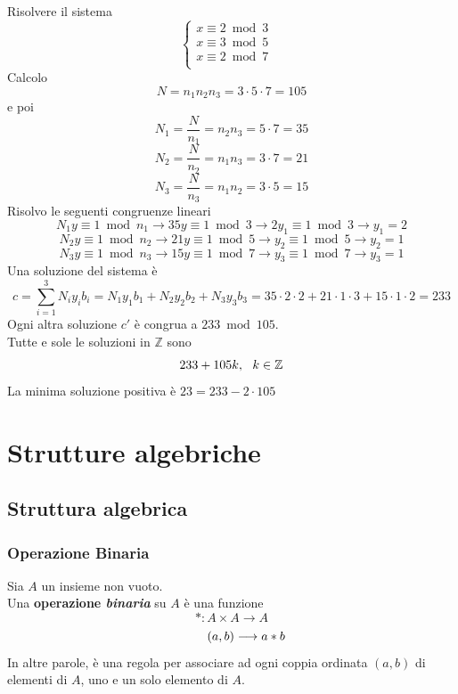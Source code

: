 \documentclass[a4paper,12pt, oneside]{book}
\begin{document}
		\begin{shaded}
			\begin{esempio}
				Risolvere il sistema
				$$\begin{cases}
				x \equiv 2 \bmod 3 \\
				x \equiv 3 \bmod 5 & \\
				x \equiv 2 \bmod 7 & \\
				\end{cases}$$
				Calcolo $$N = n_1n_2n_3 = 3 \cdot 5 \cdot 7 = 105$$ e poi
					$$N_1=\frac{N}{n_1}=n_2n_3=5\cdot7=35$$
					$$N_2=\frac{N}{n_2}=n_1n_3=3\cdot7=21$$
					$$N_3=\frac{N}{n_3}=n_1n_2=3\cdot5=15$$
				Risolvo le seguenti congruenze lineari
				$$N_1y \equiv 1 \bmod n_1 \rightarrow 35y \equiv 1 \bmod 3 \rightarrow 2y_1 \equiv 1 \bmod 3 \longrightarrow y_1=2$$
				$$N_2y \equiv 1 \bmod n_2 \rightarrow 21y \equiv 1 \bmod 5 \rightarrow y_2  \equiv 1 \bmod 5 \longrightarrow y_2=1$$
				$$N_3y \equiv 1 \bmod n_3 \rightarrow 15y \equiv 1 \bmod 7 \rightarrow y_3  \equiv 1 \bmod 7 \longrightarrow y_3=1$$
				Una soluzione del sistema è
				$$c = \sum_{i=1}^{3} N_iy_ib_i = N_1y_1b_1 + N_2y_2b_2 + N_3y_3b_3 = 35 \cdot 2 \cdot 2 + 21 \cdot 1 \cdot 3 + 15 \cdot1 \cdot2 = 233$$
				Ogni altra soluzione $c'$ è congrua a $233 \bmod 105$.\\
				Tutte e sole le soluzioni in $\mathbb{Z}$ sono
				$$233+105k, \mbox{\space\space} k \in \mathbb{Z}$$
				La minima soluzione positiva è $23 = 233-2\cdot105$
			\end{esempio}
		\end{shaded}
		
\chapter{Strutture algebriche}
	\section{Struttura algebrica}
		\subsection{Operazione Binaria}
			\begin{definizione}
				Sia $A$ un insieme non vuoto.\\
				Una \textbf{operazione \textit{binaria}} su $A$ è una funzione
				$$* : A \times A \longrightarrow A$$
				$$\mbox{\space\space\space\space\space\space\space} (a,b) \longrightarrow a * b$$
				In altre parole, è una regola per associare ad ogni coppia ordinata $(a,b)$ di elementi di $A$, uno e un solo elemento di $A$.
			\end{definizione}
\end{document}
